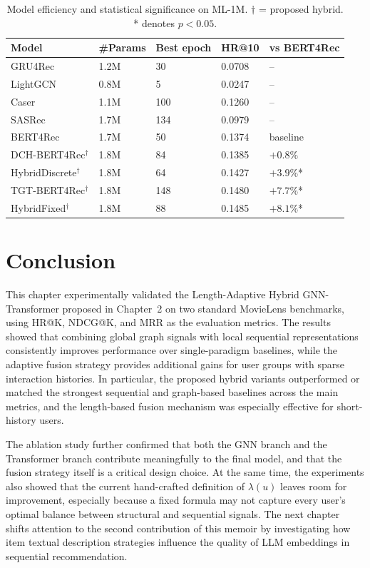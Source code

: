 \documentclass[12pt,a4paper]{report}
\begin{document}
\begin{table}[h]
\centering
\caption{Model efficiency and statistical significance on ML-1M.
\(\dagger\) = proposed hybrid. * denotes \(p < 0.05\).}
\label{tab:efficiency}
\begin{tabular}{p{3.8cm} p{2cm} p{2cm} p{2.5cm} p{2.5cm}}
\toprule
\textbf{Model} & \textbf{\#Params} & \textbf{Best epoch} &
\textbf{HR@10} & \textbf{vs BERT4Rec} \\
\midrule
GRU4Rec              & 1.2M & 30  & 0.0708 & -- \\
LightGCN             & 0.8M & 5   & 0.0247 & -- \\
Caser                & 1.1M & 100 & 0.1260 & -- \\
SASRec               & 1.7M & 134 & 0.0979 & -- \\
BERT4Rec             & 1.7M & 50  & 0.1374 & baseline \\
DCH-BERT4Rec\(^\dagger\)   & 1.8M & 84  & 0.1385 & \(+0.8\%\) \\
HybridDiscrete\(^\dagger\) & 1.8M & 64  & 0.1427 & \(+3.9\%\)*  \\
TGT-BERT4Rec\(^\dagger\)   & 1.8M & 148 & 0.1480 & \(+7.7\%\)*  \\
HybridFixed\(^\dagger\)    & 1.8M & 88  & 0.1485 & \(+8.1\%\)*  \\
\bottomrule
\end{tabular}
\end{table}

\clearpage
\section{Conclusion}
\label{sec:ch3conclusion}

This chapter experimentally validated the Length-Adaptive Hybrid GNN-Transformer
proposed in Chapter~2 on two standard MovieLens benchmarks, using HR@K,
NDCG@K, and MRR as the evaluation metrics. The results showed that combining
global graph signals with local sequential representations consistently improves
performance over single-paradigm baselines, while the adaptive fusion strategy
provides additional gains for user groups with sparse interaction histories.
In particular, the proposed hybrid variants outperformed or matched the
strongest sequential and graph-based baselines across the main metrics, and the
length-based fusion mechanism was especially effective for short-history users.

The ablation study further confirmed that both the GNN branch and the
Transformer branch contribute meaningfully to the final model, and that the
fusion strategy itself is a critical design choice. At the same time, the
experiments also showed that the current hand-crafted definition of
\(\lambda(u)\) leaves room for improvement, especially because a fixed formula
may not capture every user's optimal balance between structural and sequential
signals. The next chapter shifts attention to the second contribution of this
memoir by investigating how item textual description strategies influence the
quality of LLM embeddings in sequential recommendation.

\newpage
\printbibliography[heading=bibintoc, title={References}]
\end{document}
